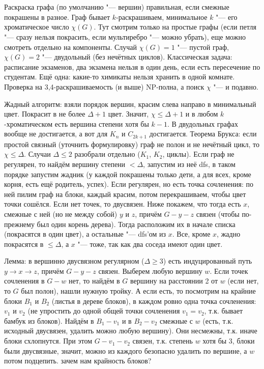 \section{} %
	Раскраска графа (по умолчанию "--- вершин) правильная, если смежные покрашены в разное.
	Граф бывает $k$-раскрашиваем, минимальное $k$ "--- его хроматическое число $\chi(G)$.
	Тут смотрим только на простые графы (если петля "--- сразу нельзя покрасить, если мультиребро "--- можно убрать),
	еще можно смотреть отдельно на компоненты.
	Случай $\chi(G)=1$ "--- пустой граф, $\chi(G)=2$ "--- двудольный (без нечётных циклов).
	Классическая задача: расписание экзаменов, два экзамена нельзя в один день, если есть пересечение по студентам.
	Ещё одна: какие-то химикаты нельзя хранить в одной комнате.
	Проверка на 3,4-раскрашиваемость (и выше) NP-полна, а поиск $\chi$ "--- и подавно.

	Жадный алгоритм: взяли порядок вершин, красим слева направо в минимальный цвет.
	Покрасит в не более $\Delta+1$ цвет.
	Значит, $\chi\le\Delta+1$ и в любом $k$-хроматическом есть вершина степени хотя бы $k-1$.
	В двудольных графах вообще не достигается, а вот для $K_n$ и $C_{2k+1}$ достигается.
	Теорема Брукса: если простой связный (\TODO уточнить формулировку) граф не полон и не нечётный цикл, то $\chi \le \Delta$.
	Случаи $\Delta \le 2$ разобрали отдельно ($K_1$, $K_2$, циклы).
	Если граф не регулярен, то найдём вершину степени $<\Delta$, запустим из неё dfs, в таком порядке запустим жадник
	(у каждой покрашены только дети, а для всех, кроме корня, есть ещё родитель, успех).
	Если регулярен, но есть точка сочленения: по ней пилим граф на блоки, каждый красим, потом перекрашиваем, чтобы цвет точки сошёлся.
	Если нет точек, то двусвязен.
	Ниже покажем, что тогда есть $x$, смежные с ней (но не между собой) $y$ и $z$, причём $G-y-z$ связен (чтобы по-прежнему был один корень дерева).
	Тогда расположим их в начале списка (покрасятся в один цвет), а остальные "--- dfs'ом из $x$.
	Все, кроме $x$, жадно покрасятся в $\le \Delta$, а $x$ "--- тоже, так как два соседа имеют один цвет.

	Лемма: в вершинно двусвязном регулярном ($\Delta \ge 3$) есть индуцированный путь $y \to x \to z$, причём $G-y-z$ связен.
	Выберем любую вершину $w$.
	Если точек сочленения в $G-w$ нет, то найдём в $G$ вершину на расстоянии 2 от $w$ (если нет, то $G$ был полон), нашли нужную тройку.
	А если есть, то посмотрим на крайние блоки $B_1$ и $B_2$ (листья в дереве блоков), в каждом ровно одна точка сочленения: $v_1$ и $v_2$
	(не упростить до одной общей точки сочленения $v_1=v_2$, т.к. бывает бамбук из блоков).
	Найдём в $B_1-v_1$ и в $B_2-v_2$ смежные с $w$ (есть, т.к. исходный двусвязен, удалить можно любую вершину).
	Они несмежны, т.к. иначе блоки схлопнутся.
	При этом $G-v_1-v_2$ связен, т.к. степень $w$ хотя бы 3, блоки были двусвязные, значит, можно из каждого безопасно удалить по вершине,
	а $w$ потом подцепить.
	\TODO зачем нам крайность блоков?

